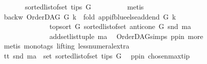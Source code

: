 \begin{isabellebody}
\ \ \ \ \ \ \ {\isacharparenleft}{\kern0pt}sorted{\isacharunderscore}{\kern0pt}list{\isacharunderscore}{\kern0pt}of{\isacharunderscore}{\kern0pt}set\ {\isacharparenleft}{\kern0pt}tips\ G{\isacharparenright}{\kern0pt}{\isacharparenright}{\kern0pt}{\isacharparenright}{\kern0pt}{\isacharparenright}{\kern0pt}{\isachardoublequoteclose}\isanewline
\ \ \ \ \ \ \ \ \isamarkupfalse%
\ {\isacharparenleft}{\kern0pt}metis{\isacharparenright}{\kern0pt}\isanewline
\ \ \ \ \ \ \isamarkupfalse%
\ \isamarkupfalse%
\ backw{\isacharcolon}{\kern0pt}\ {\isachardoublequoteopen}OrderDAG\ G\ k\ {\isacharequal}{\kern0pt}\ fold\ {\isacharparenleft}{\kern0pt}app{\isacharunderscore}{\kern0pt}if{\isacharunderscore}{\kern0pt}blue{\isacharunderscore}{\kern0pt}else{\isacharunderscore}{\kern0pt}add{\isacharunderscore}{\kern0pt}end\ G\ k{\isacharparenright}{\kern0pt}\ \isanewline
\ \ \ \ \ \ \ \ \ \ \ \ \ \ {\isacharparenleft}{\kern0pt}top{\isacharunderscore}{\kern0pt}sort\ G\ {\isacharparenleft}{\kern0pt}sorted{\isacharunderscore}{\kern0pt}list{\isacharunderscore}{\kern0pt}of{\isacharunderscore}{\kern0pt}set\ {\isacharparenleft}{\kern0pt}anticone\ G\ {\isacharparenleft}{\kern0pt}snd\ ma{\isacharparenright}{\kern0pt}{\isacharparenright}{\kern0pt}{\isacharparenright}{\kern0pt}{\isacharparenright}{\kern0pt}\isanewline
\ \ \ \ \ \ \ \ \ \ \ \ \ \ {\isacharparenleft}{\kern0pt}add{\isacharunderscore}{\kern0pt}set{\isacharunderscore}{\kern0pt}list{\isacharunderscore}{\kern0pt}tuple\ ma{\isacharparenright}{\kern0pt}{\isachardoublequoteclose}\ \isamarkupfalse%
\ OrderDAG{\isachardot}{\kern0pt}simps\ pp{\isacharunderscore}{\kern0pt}in\ more\isanewline
\ \ \ \ \ \ \ \ \isamarkupfalse%
\ {\isacharparenleft}{\kern0pt}metis\ {\isacharparenleft}{\kern0pt}mono{\isacharunderscore}{\kern0pt}tags{\isacharcomma}{\kern0pt}\ lifting{\isacharparenright}{\kern0pt}\ less{\isacharunderscore}{\kern0pt}numeral{\isacharunderscore}{\kern0pt}extra{\isacharparenleft}{\kern0pt}{}{\isacharparenright}{\kern0pt}{\isacharparenright}{\kern0pt}\ \isanewline
\ \ \ \ \ \ \isamarkupfalse%
\ tt{\isacharcolon}{\kern0pt}\ {\isachardoublequoteopen}snd\ ma\ {\isasymin}\ set\ {\isacharparenleft}{\kern0pt}sorted{\isacharunderscore}{\kern0pt}list{\isacharunderscore}{\kern0pt}of{\isacharunderscore}{\kern0pt}set\ {\isacharparenleft}{\kern0pt}tips\ G{\isacharparenright}{\kern0pt}{\isacharparenright}{\kern0pt}{\isachardoublequoteclose}\ \isamarkupfalse%
\ pp{\isacharunderscore}{\kern0pt}in\ chosen{\isacharunderscore}{\kern0pt}max{\isacharunderscore}{\kern0pt}tip\ \isanewline

\end{isabellebody}

